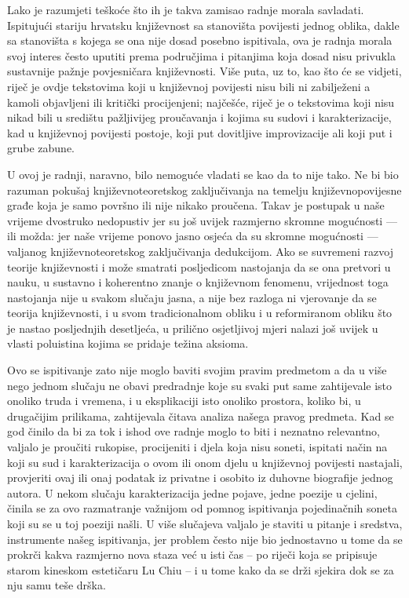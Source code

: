 \documentclass[a4paper,12pt,twoside]{report}
\begin{document}
Lako je razumjeti teškoće što ih je takva zamisao radnje morala savla­dati. Ispitujući stariju hrvatsku književnost sa stanovišta povijesti jed­nog oblika, dakle sa stanovišta s kojega se ona nije dosad posebno is­pitivala, ova je radnja morala svoj interes često uputiti prema područji­ma i pitanjima koja dosad nisu privukla sustavnije pažnje povjesničara književnosti. Više puta, uz to, kao što će se vidjeti, riječ je ovdje teksto­vima koji u književnoj povijesti nisu bili ni zabilježeni a kamoli objav­ljeni ili kritički procijenjeni; najčešće, riječ je o tekstovima koji nisu nikad bili u središtu pažljivijeg proučavanja i kojima su sudovi i karakterizacije, kad u književnoj povijesti postoje, koji put dovitljive improvizacije ali koji put i grube zabune.

U ovoj je radnji, naravno, bilo nemoguće vladati se kao da to nije tako. Ne bi bio razuman pokušaj književnoteoretskog zaključivanja na temelju književnopovijesne građe koja je samo površno ili nije nikako proučena. Takav je postupak u naše vrijeme dvostruko nedopustiv jer su još uvijek razmjerno skromne mogućnosti — ili možda: jer naše vri­jeme ponovo jasno osjeća da su skromne mogućnosti — valjanog knji­ževnoteoretskog zaključivanja dedukcijom. Ako se suvremeni razvoj teo­rije književnosti i može smatrati posljedicom nastojanja da se ona pre­tvori u nauku, u sustavno i koherentno znanje o književnom fenomenu, vrijednost toga nastojanja nije u svakom slučaju jasna, a nije bez razloga ni vjerovanje da se teorija književnosti, i u svom tradicionalnom obliku i u reformiranom obliku što je nastao posljednjih desetljeća, u pri­lično osjetljivoj mjeri nalazi još uvijek u vlasti poluistina kojima se pridaje težina aksioma.

Ovo se ispitivanje zato nije moglo baviti svojim pravim predmetom a da u više nego jednom slučaju ne obavi predradnje koje su svaki put same zahtijevale isto onoliko truda i vremena, i u eksplikaciji isto ono­liko prostora, koliko bi, u drugačijim prilikama, zahtijevala čitava ana­liza našega pravog predmeta. Kad se god činilo da bi za tok i ishod ove radnje moglo to biti i neznatno relevantno, valjalo je proučiti rukopise, procijeniti i djela koja nisu soneti, ispitati način na koji su sud i karakterizacija o ovom ili onom djelu u književnoj povijesti nastajali, pro­vjeriti ovaj ili onaj podatak iz privatne i osobito iz duhovne biografije jednog autora. U nekom slučaju karakterizacija jedne pojave, jedne poezije u cjelini, činila se za ovo razmatranje važnijom od pomnog ispi­tivanja pojedinačnih soneta koji su se u toj poeziji našli. U više slučajeva valjalo je staviti u pitanje i sredstva, instrumente našeg ispitivanja, jer problem često nije bio jednostavno u tome da se prokrči kakva razmjerno nova staza već u isti čas – po riječi koja se pripisuje starom kineskom estetičaru Lu Chiu – i u tome kako da se drži sjekira dok se za nju samu teše drška.
\end{document}
